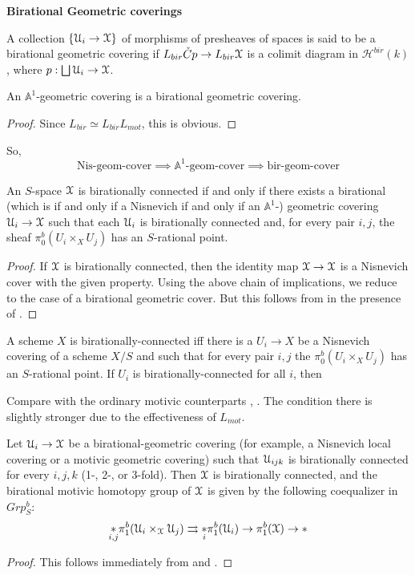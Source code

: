 \textbf{Birational Geometric coverings}
\begin{defn}
A collection $\{\EuScript{U}_i\to \EuScript{X}\}$ of morphisms of presheaves of spaces is said to be a birational geometric covering if $L_{bir}\check{C} p\to L_{bir}\EuScript{X}$ is a colimit diagram in $\mathcal{H}^{bir}(k)$, where $p: \bigsqcup\EuScript{U}_i\to \EuScript{X}$.
\end{defn}
\begin{lem}
    An $\mathbb{A}^1$-geometric covering is a birational geometric covering.
\end{lem}
\begin{proof}
    Since $L_{bir}\simeq L_{bir}L_{mot}$, this is obvious.
\end{proof}
So,
$$\text{Nis-geom-cover}\implies \mathbb{A}^1\text{-geom-cover}\implies \text{bir-geom-cover}$$
\begin{cor}
An $S$-space $\EuScript{X}$ is birationally connected if and only if there exists a birational (which is if and only if a Nisnevich if and only if an $\mathbb{A}^1$-) geometric covering $\EuScript{U}_i\to \EuScript{X}$ such that each $\EuScript{U}_{i}$ is birationally connected and, for every pair $i,j$, the sheaf $\pi_0^b(U_i\times_XU_j)$ has an $S$-rational point.
\end{cor}
\begin{proof}
    If $\EuScript{X}$ is birationally connected, then the identity map $\EuScript{X}\to\EuScript{X}$ is a Nisnevich cover with the given property. Using the above chain of implications, we reduce to the case of a birational geometric cover. But this follows from  in the presence of .
\end{proof}
\begin{cor}
   A scheme $X$ is birationally-connected iff there is a $U_i\to X$ be a Nisnevich covering of a scheme $X/S$ and such that for every pair $i,j$ the $\pi_0^b(U_i\times_XU_j)$ has an $S$-rational point. If $U_i$ is birationally-connected for all $i$, then 
\end{cor}
\begin{rem}
    Compare with the ordinary motivic counterparts , . The condition there is slightly stronger due to the effectiveness of $L_{mot}$.
\end{rem}
\begin{cor}
Let $\EuScript{U}_i\to \EuScript{X}$ be a birational-geometric covering (for example, a Nisnevich local covering or a motivic geometric covering) such that $\EuScript{U}_{ijk}$ is birationally connected for every $i,j,k$ (1-, 2-, or 3-fold). Then $\EuScript{X}$ is birationally connected, and the birational motivic homotopy group of $\EuScript{X}$ is given by the following coequalizer in $Grp^b_S$:
$$\underset{i,j}{*}\pi_1^{b}({\EuScript{U}_i\times_\EuScript{X}\EuScript{U}_j})\rightrightarrows \underset{i}{*}\pi_1^{b}({\EuScript{U}_i})\to \pi_1^{b}(\EuScript{X})\to *$$
\end{cor}
\begin{proof}
    This follows immediately from  and .
\end{proof}


